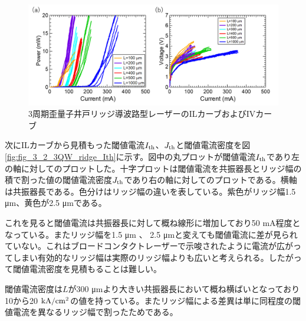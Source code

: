 {\begin{figure}[h]
	\centering
	\includegraphics[width=15cm]{figure/fig_3_2_3QW_ridge_IL.png}
		\caption{3周期歪量子井戸リッジ導波路型レーザーのILカーブおよびIVカーブ}
		\label{fig:fig_3_2_3QW_ridge_IL}
\end{figure}


次にILカーブから見積もった閾値電流$I_{\rm{th}}$、$J_{\rm{th}}$と閾値電流密度を図\ref{fig:fig_3_2_3QW_ridge_Ith}に示す。図中の丸プロットが閾値電流$I_{\rm{th}}$であり左の軸に対してのプロットした。十字プロットは閾値電流を共振器長とリッジ幅の積で割った値の閾値電流密度$J_{\rm{th}}$であり右の軸に対してのプロットである。横軸は共振器長である。色分けはリッジ幅の違いを表している。紫色がリッジ幅1.5 \si{\micro\metre}、黄色が2.5 \si{\micro\metre}である。

これを見ると閾値電流は共振器長に対して概ね線形に増加しており50 mA程度となっている。またリッジ幅を1.5 \si{\micro\metre} 、 2.5 \si{\micro\metre}と変えても閾値電流に差が見られていない。これはブロードコンタクトレーザーで示唆されたように電流が広がってしまい有効的なリッジ幅は実際のリッジ幅よりも広いと考えられる。したがって閾値電流密度を見積もることは難しい。

閾値電流密度は$L$が300 \si{\micro\metre}より大きい共振器長において概ね横ばいとなっており10から20 $\rm{kA/cm^2}$の値を持っている。またリッジ幅による差異は単に同程度の閾値電流を異なるリッジ幅で割ったためである。


}
